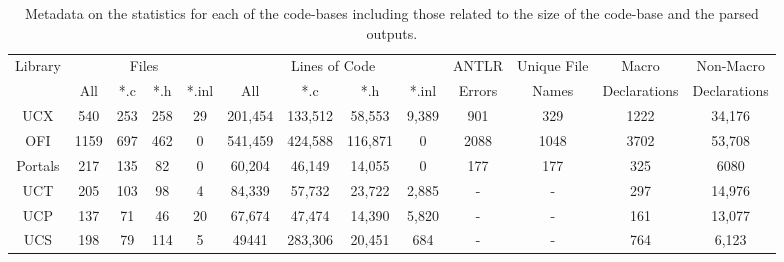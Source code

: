 \begin{table*}[ht]
    \centering
    \caption{Metadata on the statistics for each of the code-bases including those related to the size of the code-base and the parsed outputs.}
    \begin{tabular}{|c|c|c|c|c|c|c|c|c|c|c|c|c|}
        \hline
            \multirow{2}{*}{Library} & \multicolumn{4}{c|}{Files} & \multicolumn{4}{c|}{Lines of Code} & ANTLR & Unique File & Macro & Non-Macro \\
        \cline{2-9}
            & All & *.c & *.h & *.inl & All & *.c & *.h & *.inl & Errors & Names & Declarations & Declarations \\
        \hline
        \hline
            UCX & 540 & 253 & 258 & 29 & 201,454 & 133,512 & 58,553 & 9,389 & 901 & 329 & 1222 & 34,176 \\
        \hline
            OFI & 1159 & 697 & 462 & 0 & 541,459 & 424,588 & 116,871 & 0 & 2088 & 1048 & 3702 & 53,708 \\
        \hline
            Portals & 217 & 135 & 82 & 0 & 60,204 & 46,149 & 14,055 & 0 & 177 & 177 & 325 & 6080 \\
        \hline
        \hline
            UCT & 205 & 103 & 98 & 4 & 84,339 & 57,732 & 23,722 & 2,885 & -  & - & 297 & 14,976 \\
        \hline
            UCP & 137 & 71 & 46 & 20 & 67,674 & 47,474 & 14,390 & 5,820 & -  & - & 161 & 13,077 \\
        \hline
            UCS & 198 & 79 & 114 & 5 & 49441 & 283,306 & 20,451 & 684 & -  & - & 764 & 6,123 \\
        \hline
    \end{tabular}
    \label{tab:library_metadata}
\end{table*}
